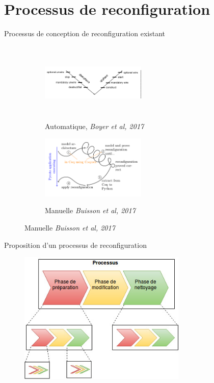 \section{Processus de reconfiguration} 

\begin{frame}{Processus de conception de reconfiguration existant}
\begin{figure}
\begin{subfigure}[b]{0.45\textwidth} %
\includegraphics[width=5cm, height=3.8cm]{imgs/boyer_protocole}
\caption{Automatique, \emph{Boyer et al, 2017}}\label{fig:orchid}
\end{subfigure}
\begin{subfigure}[b]{0.45\textwidth} %
\includegraphics[width=5cm]{imgs/buisson_approche}\\
\caption{Manuelle \emph{Buisson et al, 2017}}\label{fig:orchid}
\end{subfigure}
\end{figure}
\end{frame}

\begin{frame}{Proposition d'un processus de reconfiguration}
\begin{figure}
\centering
\includegraphics[width=8cm]{imgs/phases-de-reconfiguration.jpg}
\end{figure}
\end{frame}

